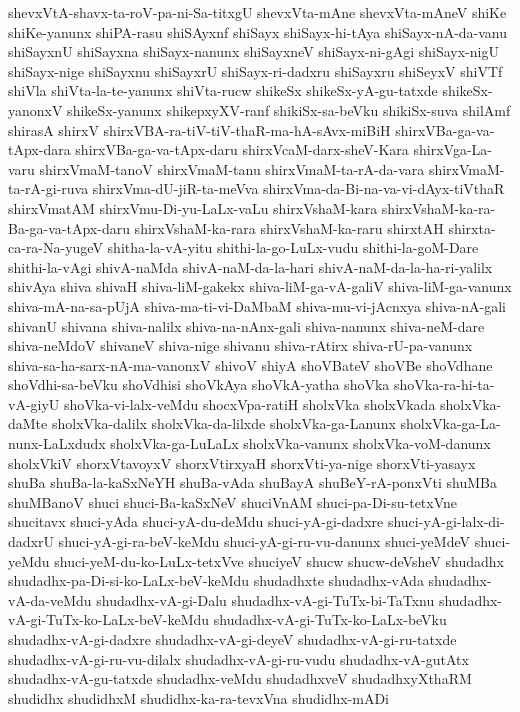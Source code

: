 {shevxVtA-shavx-ta-roV-pa-ni-Sa-titxgU
shevxVta-mAne
shevxVta-mAneV
shiKe
shiKe-yanunx
shiPA-rasu
shiSAyxnf
shiSayx
shiSayx-hi-tAya
shiSayx-nA-da-vanu
shiSayxnU
shiSayxna
shiSayx-nanunx
shiSayxneV
shiSayx-ni-gAgi
shiSayx-nigU
shiSayx-nige
shiSayxnu
shiSayxrU
shiSayx-ri-dadxru
shiSayxru
shiSeyxV
shiVTf
shiVla
shiVta-la-te-yanunx
shiVta-rucw
shikeSx
shikeSx-yA-gu-tatxde
shikeSx-yanonxV
shikeSx-yanunx
shikepxyXV-ranf
shikiSx-sa-beVku
shikiSx-suva
shilAmf
shirasA
shirxV
shirxVBA-ra-tiV-tiV-thaR-ma-hA-sAvx-miBiH
shirxVBa-ga-va-tApx-dara
shirxVBa-ga-va-tApx-daru
shirxVcaM-darx-sheV-Kara
shirxVga-La-varu
shirxVmaM-tanoV
shirxVmaM-tanu
shirxVmaM-ta-rA-da-vara
shirxVmaM-ta-rA-gi-ruva
shirxVma-dU-jiR-ta-meVva
shirxVma-da-Bi-na-va-vi-dAyx-tiVthaR
shirxVmatAM
shirxVmu-Di-yu-LaLx-vaLu
shirxVshaM-kara
shirxVshaM-ka-ra-Ba-ga-va-tApx-daru
shirxVshaM-ka-rara
shirxVshaM-ka-raru
shirxtAH
shirxta-ca-ra-Na-yugeV
shitha-la-vA-yitu
shithi-la-go-LuLx-vudu
shithi-la-goM-Dare
shithi-la-vAgi
shivA-naMda
shivA-naM-da-la-hari
shivA-naM-da-la-ha-ri-yalilx
shivAya
shiva
shivaH
shiva-liM-gakekx
shiva-liM-ga-vA-galiV
shiva-liM-ga-vanunx
shiva-mA-na-sa-pUjA
shiva-ma-ti-vi-DaMbaM
shiva-mu-vi-jAcnxya
shiva-nA-gali
shivanU
shivana
shiva-nalilx
shiva-na-nAnx-gali
shiva-nanunx
shiva-neM-dare
shiva-neMdoV
shivaneV
shiva-nige
shivanu
shiva-rAtirx
shiva-rU-pa-vanunx
shiva-sa-ha-sarx-nA-ma-vanonxV
shivoV
shiyA
shoVBateV
shoVBe
shoVdhane
shoVdhi-sa-beVku
shoVdhisi
shoVkAya
shoVkA-yatha
shoVka
shoVka-ra-hi-ta-vA-giyU
shoVka-vi-lalx-veMdu
shocxVpa-ratiH
sholxVka
sholxVkada
sholxVka-daMte
sholxVka-dalilx
sholxVka-da-lilxde
sholxVka-ga-Lanunx
sholxVka-ga-La-nunx-LaLxdudx
sholxVka-ga-LuLaLx
sholxVka-vanunx
sholxVka-voM-danunx
sholxVkiV
shorxVtavoyxV
shorxVtirxyaH
shorxVti-ya-nige
shorxVti-yasayx
shuBa
shuBa-la-kaSxNeYH
shuBa-vAda
shuBayA
shuBeY-rA-ponxVti
shuMBa
shuMBanoV
shuci
shuci-Ba-kaSxNeV
shuciVnAM
shuci-pa-Di-su-tetxVne
shucitavx
shuci-yAda
shuci-yA-du-deMdu
shuci-yA-gi-dadxre
shuci-yA-gi-lalx-di-dadxrU
shuci-yA-gi-ra-beV-keMdu
shuci-yA-gi-ru-vu-danunx
shuci-yeMdeV
shuci-yeMdu
shuci-yeM-du-ko-LuLx-tetxVve
shuciyeV
shucw
shucw-deVsheV
shudadhx
shudadhx-pa-Di-si-ko-LaLx-beV-keMdu
shudadhxte
shudadhx-vAda
shudadhx-vA-da-veMdu
shudadhx-vA-gi-Dalu
shudadhx-vA-gi-TuTx-bi-TaTxnu
shudadhx-vA-gi-TuTx-ko-LaLx-beV-keMdu
shudadhx-vA-gi-TuTx-ko-LaLx-beVku
shudadhx-vA-gi-dadxre
shudadhx-vA-gi-deyeV
shudadhx-vA-gi-ru-tatxde
shudadhx-vA-gi-ru-vu-dilalx
shudadhx-vA-gi-ru-vudu
shudadhx-vA-gutAtx
shudadhx-vA-gu-tatxde
shudadhx-veMdu
shudadhxveV
shudadhxyXthaRM
shudidhx
shudidhxM
shudidhx-ka-ra-tevxVna
shudidhx-mADi
}
